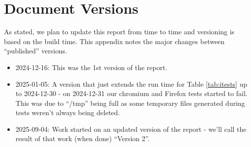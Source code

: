 \section{Document Versions}
\label{app:versions}

As stated, we plan to update this report from time to time and versioning
is based on the build time. This appendix notes the major changes between
``published'' versions.

\begin{itemize}

\item 2024-12-16: This was the 1st version of the report.

\item 2025-01-05: A version that just extends the run time for Table
    \ref{tab:itests} up to 2024-12-30 - on 2024-12-31 our chromium and Firefox
        tests started to fail. This was due to ``/tmp'' being full as some
        temporary files generated during tests weren't always being deleted.

\item 2025-09-04: Work started on an updated version of the report - we'll call
    the result of that work (when done) ``Version 2''.

\end{itemize}
